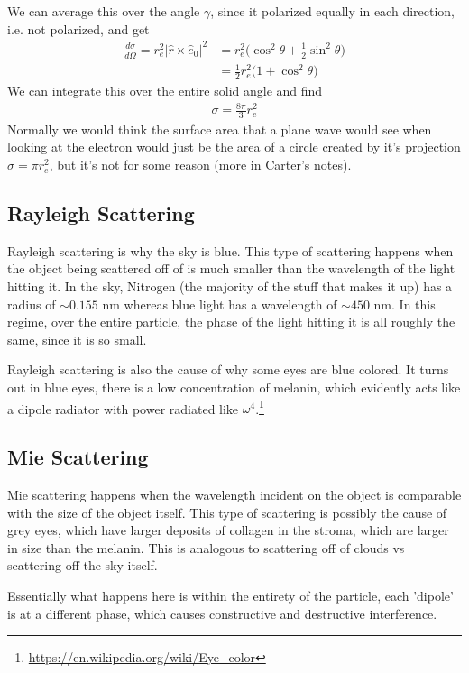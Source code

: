 We can average this over the angle $\gamma$, since it polarized equally in each direction, i.e. not polarized, and get
\begin{align}
    \frac{d\sigma}{d\Omega} = r_e^2|\hat{r}\times\hat{e}_0|^2 &= r_e^2\Big(\cos^2\theta + \frac{1}{2}\sin^2\theta\Big)\\
    &=\frac{1}{2}r_e^2\Big(1 + \cos^2\theta\Big)
\end{align}
We can integrate this over the entire solid angle and find
\begin{align}
    \sigma = \frac{8\pi}{3}r_e^2
\end{align}
Normally we would think the surface area that a plane wave would see when looking at the electron would just be the area of a circle created by it's projection $\sigma = \pi r_e^2$, but it's not for some reason (more in Carter's notes).

\subsection{Rayleigh Scattering}
Rayleigh scattering is why the sky is blue. This type of scattering happens when the object being scattered off of is much smaller than the wavelength of the light hitting it. In the sky, Nitrogen (the majority of the stuff that makes it up) has a radius of $\sim 0.155 $ nm whereas blue light has a wavelength of $\sim 450$ nm. In this regime, over the entire particle, the phase of the light hitting it is all roughly the same, since it is so small.


Rayleigh scattering is also the cause of why some eyes are blue colored. It turns out in blue eyes, there is a low concentration of melanin, which evidently acts like a dipole radiator with power radiated like $\omega^4$.\footnote{\url{https://en.wikipedia.org/wiki/Eye_color}} 
\subsection{Mie Scattering}
Mie scattering happens when the wavelength incident on the object is comparable with the size of the object itself. This type of scattering is possibly the cause of grey eyes, which have larger deposits of collagen in the stroma, which are larger in size than the melanin. This is analogous to scattering off of clouds vs scattering off the sky itself.

Essentially what happens here is within the entirety of the particle, each 'dipole' is at a different phase, which causes constructive and destructive interference.

